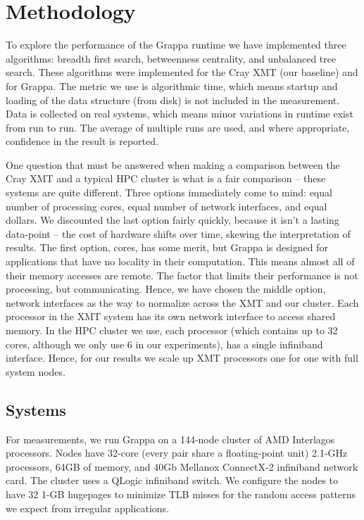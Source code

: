 \section{Methodology} \label{sec:method}

To explore the performance of the Grappa runtime we have implemented three algorithms: breadth first search, betweenness centrality, and unbalanced tree search.  These algorithms were implemented for the Cray XMT (our baseline) and for Grappa.  The metric we use is algorithmic time, which means startup and loading of the data structure (from disk) is not included in the measurement.  Data is collected on real systems, which means minor variations in runtime exist from run to run.  The average of multiple runs are used, and where appropriate, confidence in the result is reported.

One question that must be answered when making a comparison between the
Cray XMT and a typical HPC cluster is what is a fair comparison -- these
systems are quite different.  Three options immediately come to mind:
equal number of processing cores, equal number of network interfaces,
and equal dollars.  We discounted the last option fairly quickly,
because it isn't a lasting data-point -- the cost of hardware shifts
over time, skewing the interpretation of results.  The first option,
cores, has some merit, but Grappa is designed for applications that have
no locality in their computation.  This means almost all of their memory
accesses are remote.  The factor that limits their performance is not
processing, but communicating.  Hence, we have chosen the middle option,
network interfaces as the way to normalize across the XMT and our
cluster.  Each processor in the XMT system has its own network interface
to access shared memory.  In the HPC cluster we use, each processor
(which contains up to 32 cores, although we only use 6 in our
experiments), has a single infiniband interface.  Hence, for our results
we scale up XMT processors one for one with full system nodes.


\subsection{Systems}

For measurements, we run Grappa on a 144-node cluster of AMD Interlagos
processors. Nodes have 32-core (every pair share a floating-point unit)
2.1-GHz processors, 64GB of memory, and 40Gb Mellanox ConnectX-2
infiniband network card.   The cluster uses a QLogic infiniband switch.
We configure the nodes to have 32 1-GB hugepages to minimize TLB misses
for the random access patterns we expect from irregular applications.

